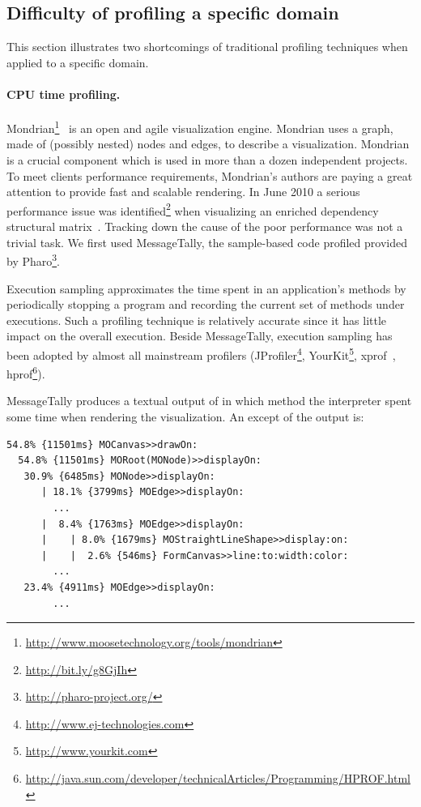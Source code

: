\documentclass[runningheads]{llncs}
\begin{document}
\subsection{Difficulty of profiling a specific domain}

This section illustrates two shortcomings of traditional profiling techniques when applied to a specific domain.\\

\paragraph{CPU time profiling.}
Mondrian\footnote{\url{http://www.moosetechnology.org/tools/mondrian}}~\cite{Meye06a} is an open and agile visualization engine. 
Mondrian uses a graph, made of (possibly nested) nodes and edges, to describe a visualization. Mondrian is a crucial component which is used in more than a dozen independent projects. To meet clients performance requirements, Mondrian's authors are paying a great attention to provide fast and scalable rendering. In June 2010 a serious performance issue was identified\footnote{\url{http://bit.ly/g8GjIh}} when visualizing an enriched dependency structural matrix~\cite{Lava09a}. Tracking down the cause of the poor performance was not a trivial task. We first used MessageTally, the sample-based code profiled provided by Pharo\footnote{\url{http://pharo-project.org/}}.

Execution sampling approximates the time spent in an application's methods by periodically stopping a program and recording the current set of methods under executions. Such a profiling technique is relatively accurate since it has little impact on the overall execution.
Beside MessageTally, execution sampling has been adopted by almost all mainstream profilers (JProfiler\footnote{\url{http://www.ej-technologies.com}}, YourKit\footnote{\url{http://www.yourkit.com}}, xprof~\cite{Gupt92a}, hprof\footnote{\url{http://java.sun.com/developer/technicalArticles/Programming/HPROF.html}}).

MessageTally produces a textual output of in which method the interpreter spent some time when rendering the visualization. An except of the output is:

\begin{lstlisting}
54.8% {11501ms} MOCanvas>>drawOn: 
  54.8% {11501ms} MORoot(MONode)>>displayOn: 
   30.9% {6485ms} MONode>>displayOn: 
      | 18.1% {3799ms} MOEdge>>displayOn: 
     	...    
      |  8.4% {1763ms} MOEdge>>displayOn: 
      |    | 8.0% {1679ms} MOStraightLineShape>>display:on: 
      |    |  2.6% {546ms} FormCanvas>>line:to:width:color: 
    	...    
   23.4% {4911ms} MOEdge>>displayOn: 	
        ...    
\end{lstlisting}
\end{document}
